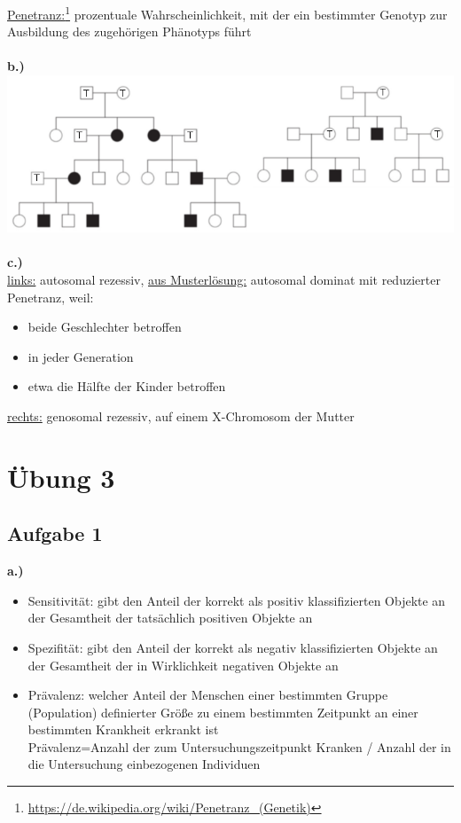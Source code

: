 \documentclass[13pt,a4paper]{article}
\begin{document}
\underline{Penetranz:}\footnote{\url{https://de.wikipedia.org/wiki/Penetranz_(Genetik)}} prozentuale Wahrscheinlichkeit, mit der ein bestimmter Genotyp zur Ausbildung des zugehörigen Phänotyps führt
\\\\
\textbf{b.)}\\
\includegraphics[width=1\textwidth]{stammbaeume1.png}
\\\\
\textbf{c.)}\\
\underline{links:} autosomal rezessiv, \underline{aus Musterlösung:} autosomal dominat mit reduzierter Penetranz, weil:
\begin{itemize}
	\item beide Geschlechter betroffen
	\item in jeder Generation
	\item etwa die Hälfte der Kinder betroffen
\end{itemize}

\underline{rechts:} genosomal rezessiv, auf einem X-Chromosom der Mutter\\

\newpage
\section{Übung 3}
\subsection{Aufgabe 1}
\textbf{a.)}
\begin{itemize}
	\item Sensitivität: gibt den Anteil der korrekt als positiv klassifizierten Objekte an der Gesamtheit der tatsächlich positiven Objekte an
	\item Spezifität: gibt den Anteil der korrekt als negativ klassifizierten Objekte an der Gesamtheit der in Wirklichkeit negativen Objekte an
	\item Prävalenz: welcher Anteil der Menschen einer bestimmten Gruppe (Population) definierter Größe zu einem bestimmten Zeitpunkt an einer bestimmten Krankheit erkrankt ist\\
	Prävalenz=Anzahl der zum Untersuchungszeitpunkt Kranken / Anzahl der in die Untersuchung einbezogenen Individuen
\end{itemize}
\end{document}
